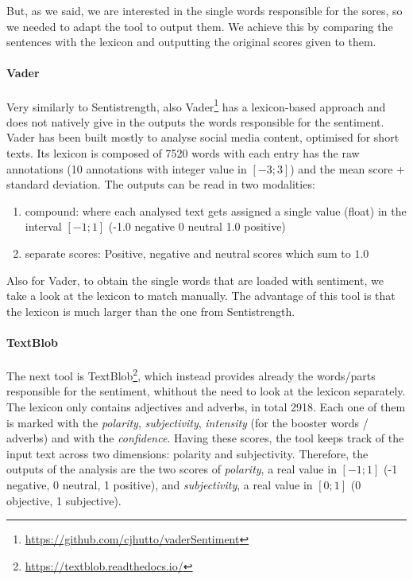 But, as we said, we are interested in the single words responsible for the sores, so we needed to adapt the tool to output them. We achieve this by comparing the sentences with the lexicon and outputting the original scores given to them.

\paragraph{Vader}
Very similarly to Sentistrength, also Vader\footnote{\url{https://github.com/cjhutto/vaderSentiment}} has a lexicon-based approach and does not natively give in the outputs the words responsible for the sentiment. Vader has been built mostly to analyse social media content, optimised for short texts.
Its lexicon is composed of 7520 words with each entry has the raw annotations (10 annotations with integer value in $[-3;3]$) and the mean score + standard deviation.
The outputs can be read in two modalities:
\begin{enumerate}
    \item compound: where each analysed text gets assigned a single value (float) in the interval $[-1;1]$ (-1.0 negative 0 neutral 1.0 positive)
    \item separate scores: Positive, negative and neutral scores which sum to $1.0$
\end{enumerate}

Also for Vader, to obtain the single words that are loaded with sentiment, we take a look at the lexicon to match manually. The advantage of this tool is that the lexicon is much larger than the one from Sentistrength.



\paragraph{TextBlob}
The next tool is TextBlob\footnote{\url{ https://textblob.readthedocs.io/}}, which instead provides already the words/parts responsible for the sentiment, whithout the need to look at the lexicon separately.
The lexicon only contains adjectives and adverbs, in total 2918. Each one of them is marked with the \emph{polarity}, \emph{subjectivity}, \emph{intensity} (for the booster words / adverbs) %
and with the \emph{confidence}. Having these scores, the tool keeps track of the input text across two dimensions: polarity and subjectivity.
Therefore, the outputs of the analysis are the two scores of \emph{polarity}, a real value in $[-1;1]$ (-1 negative, 0 neutral, 1 positive), and \emph{subjectivity}, a real value in $[0;1]$ (0 objective, 1 subjective).

